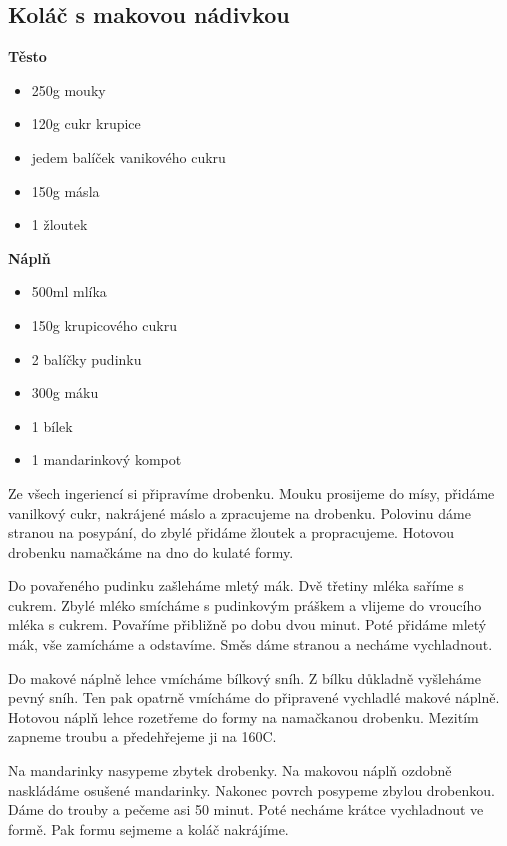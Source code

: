 \documentclass[10pt,a4paper]{article}
\newenvironment{myitemize}
{ \begin{itemize}
    \setlength{\itemsep}{0pt}
    \setlength{\parskip}{0pt}
    \setlength{\parsep}{0pt}     }
{ \end{itemize}                  }
\begin{document}
\subsection{Koláč s makovou nádivkou} 
\begin{minipage}[t]{0,5\textwidth}
\textbf{Těsto}
\begin{myitemize} 
\item 250g mouky
\item 120g cukr krupice
\item jedem balíček vanikového cukru
\item 150g másla
\item 1 žloutek
\end{myitemize}

\textbf{Náplň}
\begin{myitemize} 
\item 500ml mlíka
\item 150g krupicového cukru
\item 2 balíčky pudinku
\item 300g máku
\item 1 bílek
\item 1 mandarinkový kompot
\end{myitemize}
\end{minipage}
\begin{minipage}[t]{0,5\textwidth}
Ze všech ingeriencí si připravíme drobenku. Mouku prosijeme do mísy, přidáme vanilkový cukr, nakrájené máslo a zpracujeme na drobenku. Polovinu dáme stranou na posypání, do zbylé přidáme žloutek a propracujeme. Hotovou drobenku namačkáme na dno do kulaté formy.

Do povařeného pudinku zašleháme mletý mák. Dvě třetiny mléka saříme s cukrem. Zbylé mléko smícháme s pudinkovým práškem a vlijeme do vroucího mléka s cukrem. Povaříme přibližně po dobu dvou minut. Poté přidáme mletý mák, vše zamícháme a odstavíme. Směs dáme stranou a necháme vychladnout.

Do makové náplně lehce vmícháme bílkový sníh. Z bílku důkladně vyšleháme pevný sníh. Ten pak opatrně vmícháme do připravené vychladlé makové náplně. Hotovou náplň lehce rozetřeme do formy na namačkanou drobenku. Mezitím zapneme troubu a předehřejeme ji na 160\degree C.

Na mandarinky nasypeme zbytek drobenky. Na makovou náplň ozdobně naskládáme osušené mandarinky. Nakonec povrch posypeme zbylou drobenkou. Dáme do trouby a pečeme asi 50 minut. Poté necháme krátce vychladnout ve formě. Pak formu sejmeme a koláč nakrájíme.
\end{minipage}
\end{document}
